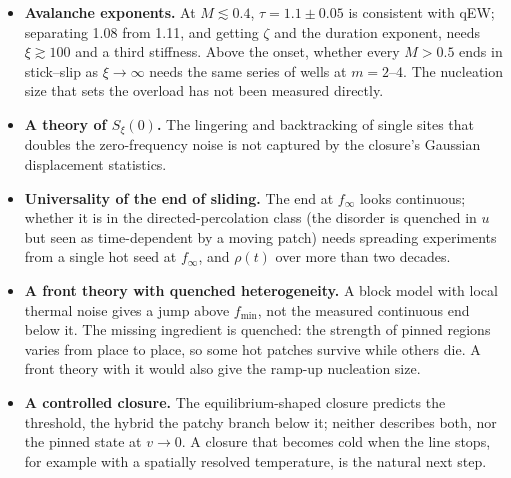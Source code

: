 \documentclass[10pt,a4paper]{article}
\begin{document}
\begin{itemize}
\item \textbf{Avalanche exponents.} At $M\lesssim0.4$, $\tau=1.1\pm0.05$ is consistent with qEW; separating 1.08 from 1.11, and getting $\zeta$ and the duration exponent, needs $\xi\gtrsim100$ and a third stiffness. Above the onset, whether every $M>0.5$ ends in stick--slip as $\xi\to\infty$ needs the same series of wells at $m=2$--4. The nucleation size that sets the overload has not been measured directly.
\item \textbf{A theory of $S_\xi(0)$.} The lingering and backtracking of single sites that doubles the zero-frequency noise is not captured by the closure's Gaussian displacement statistics.
\item \textbf{Universality of the end of sliding.} The end at $f_\infty$ looks continuous; whether it is in the directed-percolation class (the disorder is quenched in $u$ but seen as time-dependent by a moving patch) needs spreading experiments from a single hot seed at $f_\infty$, and $\rho(t)$ over more than two decades.
\item \textbf{A front theory with quenched heterogeneity.} A block model with local thermal noise gives a jump above $f_{\min}$, not the measured continuous end below it. The missing ingredient is quenched: the strength of pinned regions varies from place to place, so some hot patches survive while others die. A front theory with it would also give the ramp-up nucleation size.
\item \textbf{A controlled closure.} The equilibrium-shaped closure predicts the threshold, the hybrid the patchy branch below it; neither describes both, nor the pinned state at $v\to0$. A closure that becomes cold when the line stops, for example with a spatially resolved temperature, is the natural next step.
\end{itemize}
\end{document}
